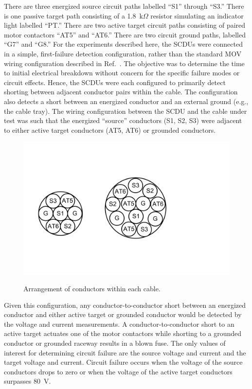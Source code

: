 There are three energized source circuit paths labelled ``S1'' through ``S3.''  There is one passive target path consisting of a 1.8~k$\Omega$ resistor simulating an indicator light labelled ``PT.'' There are two active target circuit paths consisting of paired motor contactors ``AT5'' and ``AT6.'' There are two circuit ground paths, labelled ``G7'' and ``G8.'' For the experiments described here, the SCDUs were connected in a simple, first-failure detection configuration, rather than the standard MOV wiring configuration described in Ref.~\cite{CAROLFIRE}.  The objective was to determine the time to initial electrical breakdown without concern for the specific failure modes or circuit effects. Hence, the SCDUs were each configured to primarily detect shorting between adjacent conductor pairs within the cable.  The configuration also detects a short between an energized conductor and an external ground (e.g., the cable tray). The wiring configuration between the SCDU and the cable under test was such that the energized ``source'' conductors (S1, S2, S3) were adjacent to either active target conductors (AT5, AT6) or grounded conductors.

\begin{figure}[ht]
\centering
\vspace{-0.5in}
\includegraphics[width=5.5in]{../FIGURES/Cable_Cross_Section} \\
\vspace{-0.5in}
\caption[Diagram of cable onductors]{Arrangement of conductors within each cable.}
\label{cable_cross_section}
\end{figure}

Given this configuration, any conductor-to-conductor short between an energized conductor and either active target or grounded conductor would be detected by the voltage and current measurements. A conductor-to-conductor short to an active target actuates one of the motor contactors while shorting to a grounded conductor or grounded raceway results in a blown fuse.  The only values of interest for determining circuit failure are the source voltage and current and the target voltage and current. Circuit failure occurs when the voltage of the source conductors drops to zero or when the voltage of the active target conductors surpasses 80~V.


